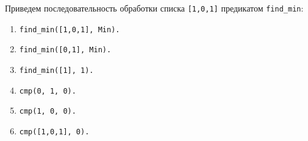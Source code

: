 Приведем последовательность обработки списка \texttt{[1,0,1]} предикатом \texttt{find\_min}:
\begin{enumerate}
\item \texttt{find\_min([1,0,1], Min).}
\item \texttt{find\_min([0,1], Min).}
\item \texttt{find\_min([1], 1).}
\item \texttt{cmp(0, 1, 0).}
\item \texttt{cmp(1, 0, 0).}
\item \texttt{cmp([1,0,1], 0).}
\end{enumerate}
